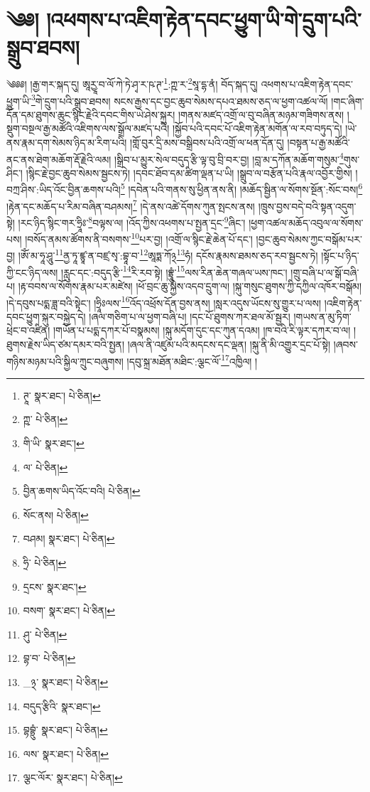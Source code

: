\setcounter{footnote}{0} 
\chapter{༄༅། །འཕགས་པ་འཇིག་རྟེན་དབང་ཕྱུག་ཡི་གེ་དྲུག་པའི་སྒྲུབ་ཐབས།}༄༅༅། །རྒྱ་གར་སྐད་དུ། ཨཱརྱཱ་བ་ལོ་ཀེ་ཏེ་ཤྭ་ར་ཥ་ཊ་\footnote{ཊཱ་  སྣར་ཐང་།  པེ་ཅིན། }:ཀྵ་ར་\footnote{ཀྵ་  པེ་ཅིན། }སཱ་དྷ་ནཾ། བོད་སྐད་དུ། འཕགས་པ་འཇིག་རྟེན་དབང་ཕྱུག་ཡི་\footnote{གི་ཡི་  སྣར་ཐང་། }གེ་དྲུག་པའི་སྒྲུབ་ཐབས། སངས་རྒྱས་དང་བྱང་ཆུབ་སེམས་དཔའ་ཐམས་ཅད་ལ་ཕྱག་འཚལ་ལོ། །གང་ཞིག་དོན་དམ་ཐུགས་ཆུང་སྙིང་རྗེའི་དབང་གིས་ཡེ་ཤེས་སྐུར། །གནས་མཛད་འགྲོ་ལ་བུ་བཞིན་མཉམ་གཟིགས་ནས། །སྡུག་བསྔལ་རྒྱ་མཚོའི་འཇིགས་ལས་སྒྲོལ་མཛད་པའི། །སྐྱོབ་པའི་དབང་པོ་འཇིག་རྟེན་མགོན་ལ་རབ་བཏུད་དེ། །ཡེ་ནས་རྣམ་དག་སེམས་ཉིད་མ་རིག་པའི། །གློ་བུར་དྲི་མས་བསྒྲིབས་པའི་འགྲོ་ལ་ཕན་དོན་དུ། །བསྟན་པ་རྒྱ་མཚོའི་ནང་ནས་ཐེག་མཆོག་རྡོ་རྗེའི་ལམ། །སྒྲིབ་པ་མྱུར་སེལ་བདུད་རྩི་ལྟ་བུ་བྲི་བར་བྱ། །བླ་མ་དཀོན་མཆོག་གསུམ་\footnote{ལ་  པེ་ཅིན། }གུས་ཤིང་། །སྙིང་རྗེ་བྱང་ཆུབ་སེམས་སྦྱངས་ཏེ། །དབང་ཐོབ་དམ་ཚིག་ལྡན་པ་ཡི། །སྒྲུབ་ལ་བརྩོན་པའི་རྣལ་འབྱོར་གྱིས། །བཀྲ་ཤིས་:ཡིད་འོང་བྱིན་ཆགས་པའི།\footnote{བྱིན་ཆགས་ཡིད་འོང་བའི།  པེ་ཅིན། } །དབེན་པའི་གནས་སུ་ཕྱིན་ནས་ནི། །མཆོད་སྦྱིན་ལ་སོགས་སྔོན་:སོང་བས།\footnote{སོང་ནས།  པེ་ཅིན། } །རྟེན་དང་མཆོད་པ་རིམ་བཞིན་བཤམས།\footnote{བཤམ།  སྣར་ཐང་།  པེ་ཅིན། } །དེ་ནས་འཚེ་དོགས་ཀུན་སྤངས་ནས། །ཁྲུས་བྱས་བདེ་བའི་སྟན་འདུག་སྟེ། །རང་ཉིད་སྙིང་གར་ཧྲཱིཿ་\footnote{ཧྲི་  པེ་ཅིན། }བལྟས་ལ། །འོད་ཀྱིས་འཕགས་པ་སྤྱན་དྲང་\footnote{དྲངས་  སྣར་ཐང་། }ཞིང་། །ཕྱག་འཚལ་མཆོད་འབུལ་ལ་སོགས་པས། །བསོད་ནམས་ཚོགས་ནི་བསགས་\footnote{བསག་  སྣར་ཐང་།  པེ་ཅིན། }པར་བྱ། །འགྲོ་ལ་སྙིང་རྗེ་ཆེན་པོ་དང་། །བྱང་ཆུབ་སེམས་ཀྱང་བསྒོམ་པར་བྱ། །ཨོཾ་མ་ཧཱ་ཤཱུ་\footnote{ཤུ་  པེ་ཅིན། }ནྱ་ཏཱ་ཛྙཱ་ན་བཛྲ་སྭ་:བྷཱ་བ་\footnote{བྷ་བ་  པེ་ཅིན། }ཨཱཏྨ་ཀོ྅\footnote{_྅་  སྣར་ཐང་།  པེ་ཅིན། }ཧཾ། དངོས་རྣམས་ཐམས་ཅད་རབ་སྦྱངས་ཏེ། །སྟོང་པ་ཉིད་ཀྱི་ངང་ཉིད་ལས། །རླུང་དང་:བདུད་རྩི་\footnote{བདུད་རྩིའི་  སྣར་ཐང་། }རི་རབ་སྟེ། །བྷྲཱུཾ་\footnote{བྷབྷྲུཾ་  སྣར་ཐང་།  པེ་ཅིན། }ལས་རིན་ཆེན་གཞལ་ཡས་ཁང་། །གྲུ་བཞི་པ་ལ་སྒོ་བཞི་པ། །རྟ་བབས་ལ་སོགས་རྣམ་པར་མཛེས། །ཕོ་བྲང་ཆུ་སྐྱེས་འདབ་དྲུག་ལ། །སྐུ་གསུང་ཐུགས་ཀྱི་དཀྱིལ་འཁོར་བསྒོམ། །དེ་དབུས་པདྨ་ཟླ་བའི་སྟེང་། །ཧྲཱིཿལས་\footnote{ལས་  སྣར་ཐང་།  པེ་ཅིན། }འོད་འཕྲོས་དོན་བྱས་ནས། །སླར་འདུས་ཡོངས་སུ་གྱུར་པ་ལས། །འཇིག་རྟེན་དབང་ཕྱུག་སྐུར་བསྐྱེད་དེ། །ཞལ་གཅིག་པ་ལ་ཕྱག་བཞི་པ། །དང་པོ་ཐུགས་ཀར་ཐལ་མོ་སྦྱར། །གཡས་ན་མུ་ཏིག་ཕྲེང་བ་འཛིན། །གཡོན་པ་པདྨ་དཀར་པོ་བསྣམས། །སྐུ་མདོག་དུང་དང་ཀུན་དའམ། །ཁ་བའི་རི་ལྟར་དཀར་བ་ལ། །ཐུགས་རྗེས་ཡིད་ཙམ་དམར་བའི་སྤྱན། །ཞལ་ནི་འཛུམ་པའི་མདངས་དང་ལྡན། །སྐུ་ནི་མི་འགྱུར་དྲང་པོ་སྟེ། །ཞབས་གཉིས་མཉམ་པའི་སྐྱིལ་ཀྲུང་བཞུགས། །དབུ་སྐྲ་མཐོན་མཐིང་:ལྕང་ལོ་\footnote{ལྕང་ལོར་  སྣར་ཐང་།  པེ་ཅིན། }འཁྱིལ། །
